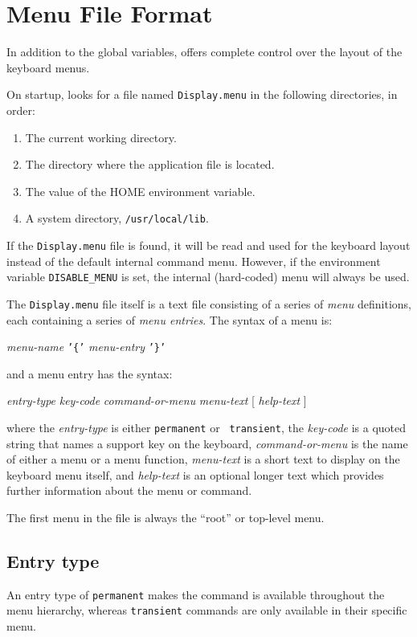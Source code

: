 \section{Menu File Format}
\label{secMenuFmt}

In addition to the global variables, \display{} offers complete control over
the layout of the keyboard menus.

On startup, \display{} looks for a file named {\tt Display.menu} in the 
following directories, in order:
\begin{enumerate}
\item The current working directory.
\item The directory where the \display{} application file is located.
\item The value of the HOME environment variable.
\item A system directory, {\tt /usr/local/lib}.
\end{enumerate}
If the {\tt Display.menu} file is found, it will be read and used for the keyboard layout instead of the default internal command menu. However, 
if the environment variable {\tt DISABLE\_MENU} is set, the internal
(hard-coded) menu will always be used.

The {\tt Display.menu} file itself is a text file consisting of a series of {\em menu} definitions, each containing a series of {\em menu entries}. The syntax of a menu is:

{\em menu-name} {\tt '\{'} {\em menu-entry} {\tt '\}'}

and a menu entry has the syntax:

{\em entry-type} {\em key-code} {\em command-or-menu} {\em menu-text} [ {\em help-text} ]

where the {\em entry-type} is either {\tt permanent} or {\tt
  transient}, the {\em key-code} is a quoted string that names a
support key on the keyboard, {\em command-or-menu} is the name of
either a menu or a \display{} menu function, {\em menu-text} is a
short text to display on the keyboard menu itself, and {\em help-text}
is an optional longer text which provides further information about
the menu or command.

The first menu in the file is always the ``root'' or top-level menu.

\subsection{Entry type}
An entry type of {\tt permanent} makes the command is available throughout the menu hierarchy, whereas {\tt transient} commands are only available in their specific menu.

